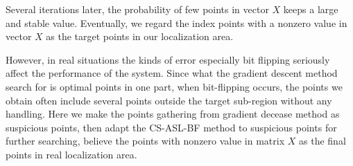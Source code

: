  Several iterations later,  the probability of few points in vector $X$ keeps a large and stable value. Eventually, we regard the index points with a nonzero  value in  vector $X$ as the target points in our localization area.
 
 However, in real situations the kinds of error especially bit flipping seriously affect the performance of the system. Since what the gradient descent method search for is optimal points in one part, when bit-flipping occurs, the points we obtain often include several points outside the target sub-region without any handling. Here we  make the points gathering from gradient decease method as suspicious points, then adapt the CS-ASL-BF method to suspicious points for further searching, believe the points with nonzero value in matrix $X$ as the final points in real localization area.
 


